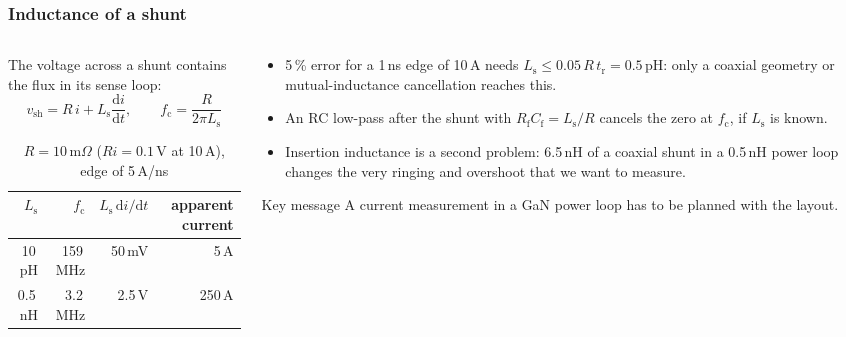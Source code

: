 \begin{frame}
	\frametitle{Inductance of a shunt}
	\begin{columns}[T]
		\begin{column}{0.47\textwidth}
			\small
			The voltage across a shunt contains the flux in its sense loop:
			\begin{equation*}
				v_\mathrm{sh}=R\,i+L_\mathrm{s}\frac{\mathrm{d}i}{\mathrm{d}t},\qquad f_\mathrm{c}=\frac{R}{2\pi L_\mathrm{s}}
			\end{equation*}
			\begin{table}
				\centering
				\footnotesize
				\begin{tabular}{|r|r|r|r|}
					\hline
					$L_\mathrm{s}$ & $f_\mathrm{c}$ & $L_\mathrm{s}\,\mathrm{d}i/\mathrm{d}t$ & apparent current \\
					\hline
					10\,pH         & 159\,MHz       & 50\,mV                                  & 5\,A               \\
					0.5\,nH        & 3.2\,MHz       & 2.5\,V                                  & 250\,A             \\
					\hline
				\end{tabular}
				\caption{$R=10$\,m$\Omega$ ($Ri=0.1$\,V at 10\,A), edge of 5\,A/ns}
			\end{table}
		\end{column}
		\begin{column}{0.5\textwidth}
			\small
			\begin{itemize}
				\item 5\,\% error for a 1\,ns edge of 10\,A needs $L_\mathrm{s}\leq0.05\,R\,t_\mathrm{r}=0.5$\,pH: only a coaxial geometry or mutual-inductance cancellation reaches this.
				\item An RC low-pass after the shunt with $R_\mathrm{f}C_\mathrm{f}=L_\mathrm{s}/R$ cancels the zero at $f_\mathrm{c}$, if $L_\mathrm{s}$ is known.
				\item Insertion inductance is a second problem: 6.5\,nH of a coaxial shunt in a 0.5\,nH power loop changes the very ringing and overshoot that we want to measure.
			\end{itemize}
			\begin{block}{Key message}
				A current measurement in a GaN power loop has to be planned with the layout.
			\end{block}
		\end{column}
	\end{columns}
\end{frame}

